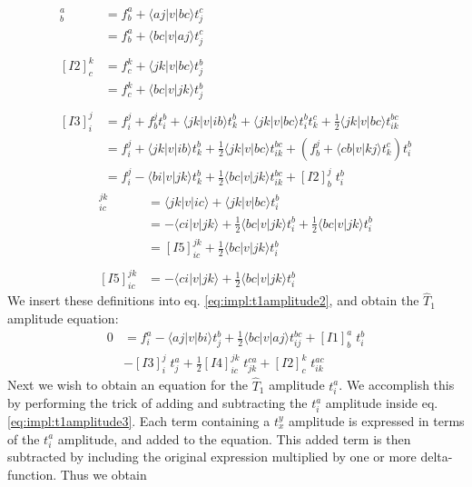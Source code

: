 \begin{align}
[I1]_b^a&=f_{b}^{a}+\langle aj|v|bc\rangle t_j^c\nonumber\\
&=f_{b}^{a}+\langle bc|v|aj\rangle t_j^c\label{eq:impl:t1intermediates1}\\
\nonumber\\
[I2]_c^k&=f_{c}^{k}+\langle jk|v|bc\rangle t_j^b\nonumber\\
&=f_{c}^{k}+\langle bc|v|jk\rangle t_j^b\label{eq:impl:t1intermediates2}\\
\nonumber\\
[I3]_i^j&=f_{i}^{j}+f_b^jt_i^b+\langle jk|v|ib\rangle t_{k}^{b}+\langle jk|v|bc\rangle t_i^bt_k^c+\frac{1}{2}\langle jk|v|bc\rangle t_{ik}^{bc}\nonumber\\
&=f_{i}^{j}+\langle jk|v|ib\rangle t_{k}^{b}+\frac{1}{2}\langle jk|v|bc\rangle t_{ik}^{bc}+\left(f_b^j+\langle cb|v|kj\rangle t_k^c\right)t_i^b\nonumber\\
&=f_{i}^{j}-\langle bi|v|jk\rangle t_{k}^{b}+\frac{1}{2}\langle bc|v|jk\rangle t_{ik}^{bc}+[I2]_b^j\phantom{.}t_i^b
\label{eq:impl:t1intermediates3}
\end{align}
%
\begin{align}
[I4]_{ic}^{jk}&=\langle jk|v|ic\rangle +\langle jk|v|bc\rangle t_i^b\nonumber\\
&=-\langle ci|v|jk\rangle+\frac{1}{2}\langle bc|v|jk\rangle t_i^b+\frac{1}{2}\langle bc|v|jk\rangle t_i^b\nonumber\\
&=[I5]_{ic}^{jk}+\frac{1}{2}\langle bc|v|jk\rangle t_i^b\label{eq:impl:t1intermediates4}\\
\nonumber\\
[I5]_{ic}^{jk}&=-\langle ci|v|jk\rangle+\frac{1}{2}\langle bc|v|jk\rangle t_i^b\label{eq:impl:t1intermediates5}
\end{align}
We insert these definitions into eq. \ref{eq:impl:t1amplitude2}, and obtain the $\hat{T}_1$ amplitude equation:
\begin{align}
0&=f_i^a - \langle aj|v|bi \rangle t_{j}^{b}+\frac{1}{2}\langle bc|v|aj\rangle t_{ij}^{bc}+[I1]_b^a\phantom{.}t_i^b\nonumber\\
&-[I3]_i^j\phantom{.}t_{j}^{a}+\frac{1}{2}[I4]_{ic}^{jk}\phantom{.}t_{jk}^{ca}+[I2]_c^k\phantom{.}t_{ik}^{ac}
\label{eq:impl:t1amplitude3}
\end{align}
Next we wish to obtain an equation for the $\hat{T}_1$ amplitude $t_i^a$. We accomplish this by performing the trick of adding and subtracting the $t_i^a$ amplitude inside eq. \ref{eq:impl:t1amplitude3}. Each term containing a $t_x^y$ amplitude is expressed in terms of the $t_i^a$ amplitude, and added to the equation. This added term is then subtracted by including the original expression multiplied by one or more delta-function. Thus we obtain
